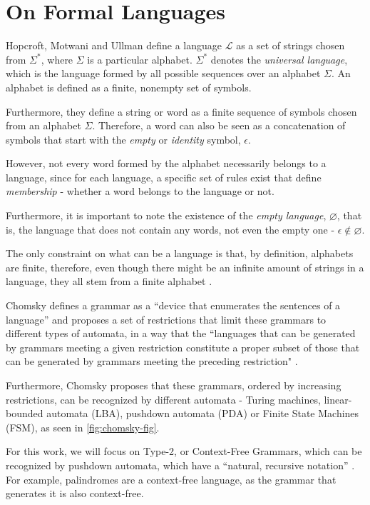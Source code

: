 \chapter{On Formal Languages}

Hopcroft, Motwani and Ullman define a language $\mathcal{L}$ as a set of strings chosen from $\Sigma^*$, where $\Sigma$ is a particular alphabet. $\Sigma^*$ denotes the \emph{universal language}, which is the language formed by all possible sequences over an alphabet $\Sigma$. An alphabet is defined as a finite, nonempty set of symbols. \cite{hopcroft-automata}

Furthermore, they define a string or word as a finite sequence of symbols chosen from an alphabet $\Sigma$. Therefore, a word can also be seen as a concatenation of symbols that start with the \emph{empty} or \emph{identity} symbol, $\epsilon$.

However, not every word formed by the alphabet necessarily belongs to a language, since for each language, a specific set of rules exist that define \emph{membership} - whether a word belongs to the language or not.

Furthermore, it is important to note the existence of the \emph{empty language}, $\varnothing$, that is, the language that does not contain any words, not even the empty one - $\epsilon \notin \varnothing$.

The only constraint on what can be a language is that, by definition, alphabets are finite, therefore, even though there might be an infinite amount of strings in a language, they all stem from a finite alphabet \cite{hopcroft-automata}.

Chomsky defines a grammar as a ``device that enumerates the sentences of a language'' and proposes a set of restrictions that limit these grammars to different types of automata, in a way that the ``languages that can be generated by grammars meeting a given restriction constitute a proper subset of those that can be generated by grammars meeting the preceding restriction" \cite{chomsky-hierarchy}. 

Furthermore, Chomsky proposes that these grammars, ordered by increasing restrictions, can be recognized by different automata - Turing machines, linear-bounded automata (LBA), pushdown automata (PDA) or Finite State Machines (FSM), as seen in \ref{fig:chomsky-fig}.

For this work, we will focus on Type-2, or Context-Free Grammars, which can be recognized by pushdown automata, which have a ``natural, recursive notation'' \cite{hopcroft-automata}. For example, palindromes are a context-free language, as the grammar that generates it is also context-free.

